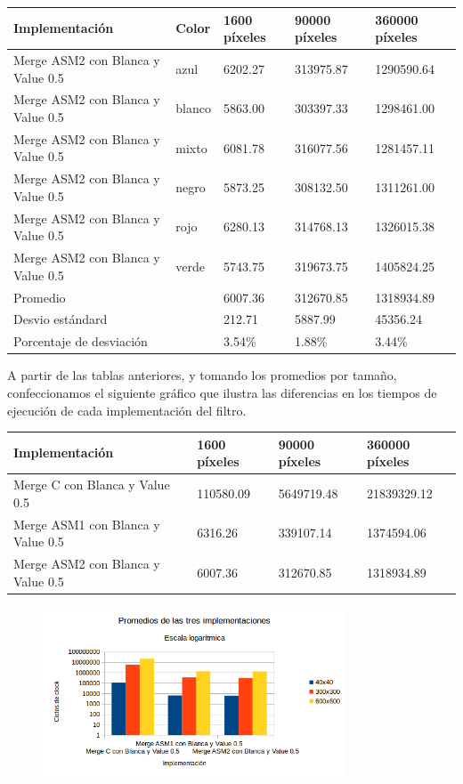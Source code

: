 \begin{tabular}{| l | l | l | l | l |}
\hline
Implementación & Color & 1600 píxeles & 90000 píxeles & 360000 píxeles\\
\hline
Merge ASM2 con Blanca y Value 0.5 & azul & 6202.27 &	313975.87	& 1290590.64\\ 
\hline
Merge ASM2 con Blanca y Value 0.5 & blanco & 5863.00 &	303397.33 & 	1298461.00\\ 
\hline
Merge ASM2 con Blanca y Value 0.5 & mixto & 6081.78	& 316077.56 &	1281457.11\\ 
\hline
Merge ASM2 con Blanca y Value 0.5 & negro & 5873.25	& 308132.50 &	1311261.00\\
\hline
Merge ASM2 con Blanca y Value 0.5 & rojo & 6280.13 &	314768.13	& 1326015.38\\
\hline
Merge ASM2 con Blanca y Value 0.5 & verde & 5743.75	& 319673.75	& 1405824.25\\ 
\hline
Promedio & &  6007.36 & 312670.85 &	1318934.89\\
\hline
Desvio estándard  && 212.71 &	5887.99 &	45356.24\\
\hline
Porcentaje de desviación  && 3.54\% &	1.88\% &	3.44\%\\
\hline
\end{tabular}

A partir de las tablas anteriores, y tomando los promedios por tamaño, confeccionamos el siguiente gráfico que ilustra las diferencias en los tiempos de ejecución de cada implementación del filtro.

\begin{tabular}{| l | l | l | l|}
\hline
Implementación  & 1600 píxeles & 90000 píxeles & 360000 píxeles\\
\hline
Merge C con Blanca y Value 0.5  & 110580.09	& 5649719.48 &	21839329.12\\
\hline
Merge ASM1 con Blanca y Value 0.5  & 6316.26 &	339107.14 &	1374594.06\\
\hline
Merge ASM2 con Blanca y Value 0.5 & 6007.36 &	312670.85 &	1318934.89\\
\hline
\end{tabular}

\begin{figure}[ht]
\centering
\includegraphics[width=90mm]{merge/grafico_merge_conBlancas.png}
\end{figure}



